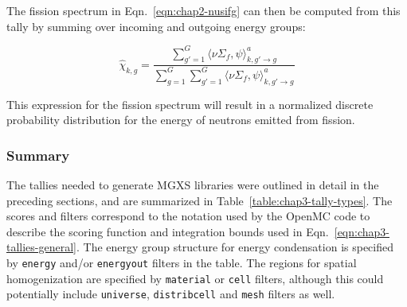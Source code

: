 \noindent The fission spectrum in Eqn.~\ref{eqn:chap2-nusifg} can then be computed from this tally by summing over incoming and outgoing energy groups:

\begin{equation}
\label{eqn:chap3-chi}
\hat{\chi}_{k,g} = \frac{\displaystyle\sum\limits_{g'=1}^{G} \langle \nu\Sigma_{f}, \psi \rangle_{k,g'\rightarrow g}^{a}}{\displaystyle\sum\limits_{g=1}^{G} \displaystyle\sum\limits_{g'=1}^{G} \langle \nu\Sigma_{f}, \psi \rangle_{k,g'\rightarrow g}^{a}}
\end{equation}

\noindent This expression for the fission spectrum will result in a normalized discrete probability distribution for the energy of neutrons emitted from fission.


\subsubsection{Summary}
\label{subsubsec:chap3-tally-types-summary}

The tallies needed to generate \ac{MGXS} libraries were outlined in detail in the preceding sections, and are summarized in Table~\ref{table:chap3-tally-types}. The scores and filters correspond to the notation used by the OpenMC code to describe the scoring function and integration bounds used in Eqn.~\ref{eqn:chap3-tallies-general}. 
The energy group structure for energy condensation is specified by \texttt{energy} and/or \texttt{energyout} filters in the table. The regions for spatial homogenization are specified by \texttt{material} or \texttt{cell} filters, although this could potentially include \texttt{universe}, \texttt{distribcell} and \texttt{mesh} filters as well.


